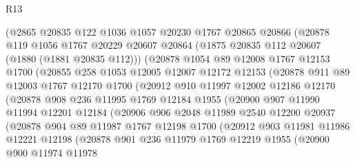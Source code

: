\begin{lexlean}{R13}
\begin{coremodule}
          (@2865
            @20835
            @122
            @1036
            @1057
            @20230
            @1767
            @20865
            @20866
            (@20878
              @119
              @1056
              @1767
              @20229
              @20607
              @20864
              (@1875 @20835 @112 @20607 (@1880 (@1881 @20835 @112)))
              (@20878
                @1054
                @89
                @12008
                @1767
                @12153
                @1700
                (@20855
                  @258
                  @1053
                  @12005
                  @12007
                  @12172
                  @12153
                  (@20878
                    @911
                    @89
                    @12003
                    @1767
                    @12170
                    @1700
                    (@20912
                      @910
                      @11997
                      @12002
                      @12186
                      @12170
                      (@20878
                        @908
                        @236
                        @11995
                        @1769
                        @12184
                        @1955
                        (@20900
                          @907
                          @11990
                          @11994
                          @12201
                          @12184
                          (@20906
                            @906
                            @2048
                            @11989
                            @2540
                            @12200
                            @20937
                            (@20878
                              @904
                              @89
                              @11987
                              @1767
                              @12198
                              @1700
                              (@20912
                                @903
                                @11981
                                @11986
                                @12221
                                @12198
                                (@20878
                                  @901
                                  @236
                                  @11979
                                  @1769
                                  @12219
                                  @1955
                                  (@20900
                                    @900
                                    @11974
                                    @11978

\end{coremodule}
\end{lexlean}
